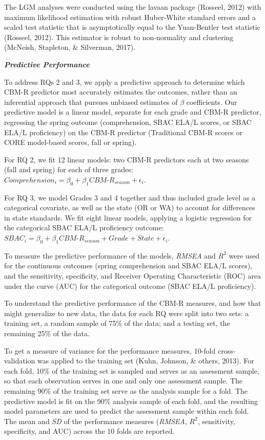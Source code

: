 \documentclass[
  english,
  man, fleqn, noextraspace]{apa6}
\begin{document}
The LGM analyses were conducted using the lavaan package (Rosseel, 2012) with maximum likelihood estimation with robust Huber-White standard errors and a scaled test statistic that is asymptotically equal to the Yuan-Bentler test statistic (Rosseel, 2012). This estimator is robust to non-normality and clustering (McNeish, Stapleton, \& Silverman, 2017).

\textbf{\emph{Predictive Performance}}

To address RQs 2 and 3, we apply a predictive approach to determine which CBM-R predictor most accurately estimates the outcomes, rather than an inferential approach that pursues unbiased estimates of \(\beta\) coefficients. Our predictive model is a linear model, separate for each grade and CBM-R predictor, regressing the spring outcome (comprehension, SBAC ELA/L scores, or SBAC ELA/L proficiency) on the CBM-R predictor (Traditional CBM-R scores or CORE model-based scores, fall or spring).

For RQ 2, we fit 12 linear models: two CBM-R predictors each at two seasons (fall and spring) for each of three grades: \(Comprehension_i = \beta_0 + \beta_1CBM\mbox{-}R_{season} + \epsilon_i\).

For RQ 3, we model Grades 3 and 4 together and thus included grade level as a categorical covariate, as well as the state (OR or WA) to account for differences in state standards. We fit eight linear models, applying a logistic regression for the categorical SBAC ELA/L proficiency outcome: \(SBAC_i = \beta_0 + \beta_1CBM\mbox{-}R_{season} + Grade + State + \epsilon_i\).

To measure the predictive performance of the models, \emph{RMSEA} and \(R^2\) were used for the continuous outcomes (spring comprehension and SBAC ELA/L scores), and the sensitivity, specificity, and Receiver Operating Characteristic (ROC) area under the curve (AUC) for the categorical outcome (SBAC ELA/L proficiency).

To understand the predictive performance of the CBM-R measures, and how that might generalize to new data, the data for each RQ were split into two sets: a training set, a random sample of 75\% of the data; and a testing set, the remaining 25\% of the data.

To get a measure of variance for the performance measures, 10-fold cross-validation was applied to the training set (Kuhn, Johnson, \& others, 2013). For each fold, 10\% of the training set is sampled and serves as an assessment sample, so that each observation serves in one and only one assessment sample. The remaining 90\% of the training set serve as the analysis sample for a fold. The predictive model is fit on the 90\% analysis sample of each fold, and the resulting model parameters are used to predict the assessment sample within each fold. The mean and \emph{SD} of the performance measures (\emph{RMSEA}, \(R^2\), sensitivity, specificity, and AUC) across the 10 folds are reported.
\end{document}
